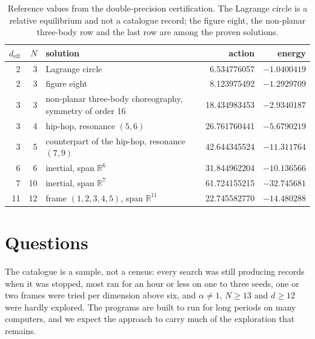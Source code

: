 \documentclass[11pt]{amsart}
\theoremstyle{definition}
\newcommand{\R}{\mathbb{R}}
\newcommand{\deff}{d_{\mathrm{eff}}}
\begin{document}
\begin{table}[ht]
\caption{Reference values from the double-precision certification. The Lagrange circle is a relative equilibrium and not a catalogue record; the figure eight, the non-planar three-body row and the last row are among the proven solutions.}\label{tab:values}
\centering\small
\begin{tabular}{@{}rrlrr@{}}
\toprule
$\deff$ & $N$ & solution & action & energy\\
\midrule
2 & 3 & Lagrange circle & 6.534776057 & $-1.0400419$\\
2 & 3 & figure eight & 8.123975492 & $-1.2929709$\\
3 & 3 & non-planar three-body choreography, symmetry of order 16 & 18.434983453 & $-2.9340187$\\
3 & 4 & hip-hop, resonance $(5,6)$ & 26.761760441 & $-5.6790219$\\
3 & 5 & counterpart of the hip-hop, resonance $(7,9)$ & 42.644345524 & $-11.311764$\\
6 & 6 & inertial, span $\R^6$ & 31.844962204 & $-10.136566$\\
7 & 10 & inertial, span $\R^7$ & 61.724155215 & $-32.745681$\\
11 & 12 & frame $(1,2,3,4,5)$, span $\R^{11}$ & 22.745582770 & $-14.480288$\\
\bottomrule
\end{tabular}
\end{table}

\section{Questions}\label{sec:questions}

The catalogue is a sample, not a census: every search was still producing records when it was stopped, most ran for an hour or less on one to three seeds, one or two frames were tried per dimension above six, and $\alpha\ne1$, $N\ge13$ and $d\ge12$ were hardly explored. The programs are built to run for long periods on many computers, and we expect the approach to carry much of the exploration that remains.
\end{document}
